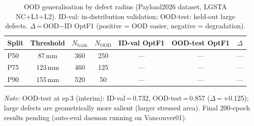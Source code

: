\begin{table}[t]
\centering
\caption{OOD generalisation by defect radius (Payload2026 dataset, LGSTA NC+L1+L2).
         ID-val: in-distribution validation; OOD-test: held-out large defects.
         $\Delta$\,=\,OOD$-$ID OptF1 (positive = OOD easier, negative = degradation).}
\label{tab:ood}
\begin{tabular}{lcccccc}
\toprule
Split    & Threshold & $N_\text{train}$ & $N_\text{OOD}$
         & ID-val OptF1 & OOD-test OptF1 & $\Delta$ \\
\midrule
P50      & 87\,mm  & 360 & 250 & --- & --- & --- \\  %
P75      & 123\,mm & 460 & 125 & --- & --- & --- \\  %
P90      & 155\,mm & 520 & 50  & --- & --- & --- \\  %
\bottomrule
\end{tabular}
\vspace{2pt}

{\footnotesize \textit{Note:} OOD-test at ep\,3 (interim): ID-val\,=\,0.732, OOD-test\,=\,0.857 ($\Delta$\,=\,+0.125);
large defects are geometrically more salient (larger stressed area).
Final 200-epoch results pending (auto-eval daemon running on Vancouver01).}
\end{table}
